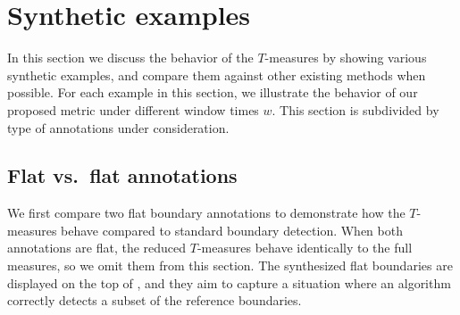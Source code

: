 \documentclass{article}
\begin{document}
\section{Synthetic examples}\label{sec:examples}

In this section we discuss the behavior of the $T$-measures by showing various synthetic examples, and compare them against other existing methods when possible.
For each example in this section, we illustrate the behavior of our proposed metric under different window times $w$.
This section is subdivided by type of annotations under consideration.

\subsection{Flat vs.\ flat annotations}

We first compare two flat boundary annotations to demonstrate how the $T$-measures behave compared to 
standard boundary detection.
When both annotations are flat, the reduced $T$-measures behave identically to the full measures, so we omit
them from this section.
The synthesized flat boundaries are displayed on the top of , and they aim to capture a
situation where an algorithm correctly detects a subset of the reference boundaries.  
\end{document}
